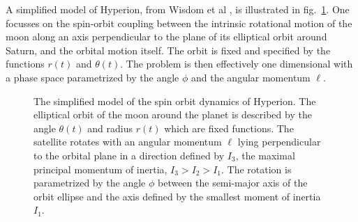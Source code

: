 \documentclass[12pt]{article}
\theoremstyle{plain}
\theoremstyle{definition}
\theoremstyle{remark}
\begin{document}
A simplified model of Hyperion, from Wisdom et al \cite{WPM}, is illustrated in fig.~\ref{f4}. One focusses on the spin-orbit coupling between the intrinsic rotational motion of the moon along an axis perpendicular to the plane of its elliptical orbit around Saturn, and the orbital motion itself. The orbit is fixed and specified by the functions $r(t)$ and $\theta(t)$. The problem is then effectively one dimensional with a phase space parametrized by the angle $\phi$ and the angular momentum $\ell$.
\begin{figure}[ht]
\begin{center}
\end{center}
\caption{The simplified model of the spin orbit dynamics of Hyperion. The elliptical orbit of the moon around the planet is described by the angle $\theta(t)$ and radius $r(t)$ which are fixed  functions. The satellite rotates with an angular momentum $\ell$ lying perpendicular to the orbital plane in a direction defined by $I_3$, the maximal principal momentum of inertia, $I_3>I_2>I_1$. The rotation is parametrized by the angle $\phi$ between the semi-major axis of the orbit ellipse and the axis defined by the smallest moment of inertia $I_1$.}
\label{f4}
\end{figure}
\end{document}
